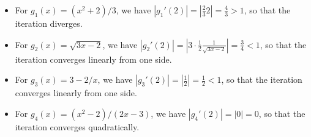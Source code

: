 \documentclass[11pt]{article}
\begin{document}
	\begin{itemize}
		\item For $g_1(x) = (x^2 + 2) / 3$, we have $|g_1'(2)| = |\frac{2}{3}2| = \frac{4}{3} > 1$, so that the iteration diverges.
		\item For $g_2(x) = \sqrt{3x - 2}$, we have $|g_2'(2)| = |3 \cdot \frac{1}{2} \frac{1}{\sqrt{3x - 2}}| = \frac{3}{4} < 1$, so that the iteration converges linearly from one side.
		\item For $g_3(x) = 3 - 2/x$, we have $|g_3'(2)| = |\frac{1}{2}| = \frac{1}{2} < 1$, so that the iteration converges linearly from one side.
		\item For $g_4(x) = (x^2 - 2) / (2x - 3)$, we have $|g_4'(2)| = |0| = 0$, so that the iteration converges quadratically.
	\end{itemize}
\end{document}
